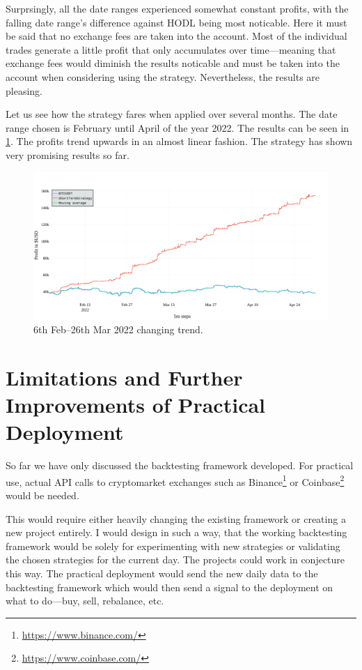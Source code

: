 Surprsingly, all the date ranges experienced somewhat constant profits, with the falling date range's difference against HODL being most noticable. Here it must be said that no exchange fees are taken into the account. Most of the individual trades generate a little profit that only accumulates over time---meaning that exchange fees would diminish the results noticable and must be taken into the account when considering using the strategy. Nevertheless, the results are pleasing.

Let us see how the strategy fares when applied over several months. The date range chosen is February until April of the year 2022. The results can be seen in \ref{figure-short-term-long}. The profits trend upwards in an almost linear fashion. The strategy has shown very promising results so far.

\begin{figure}[!hbt]
    \centering
    \includegraphics[width=\columnwidth]{figures/short-term-long.pdf}
    \caption{6th Feb--26th Mar 2022 changing trend.}
    \label{figure-short-term-long}
\end{figure}

\chapter{Limitations and Further Improvements of Practical Deployment}
\label{chapter-limitations-and-improvements}

So far we have only discussed the backtesting framework developed. For practical use, actual API calls to cryptomarket exchanges such as Binance\footnote{\url{https://www.binance.com/}} or Coinbase\footnote{\url{https://www.coinbase.com/}} would be needed.

This would require either heavily changing the existing framework or creating a new project entirely. I would design in such a way, that the working backtesting framework would be solely for experimenting with new strategies or validating the chosen strategies for the current day. The projects could work in conjecture this way. The practical deployment would send the new daily data to the backtesting framework which would then send a signal to the deployment on what to do---buy, sell, rebalance, etc.

